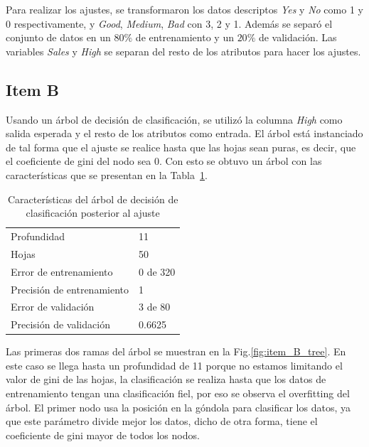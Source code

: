 Para realizar los ajustes, se transformaron los datos descriptos \emph{Yes} y \emph{No} como 1 y 0 respectivamente, y \emph{Good}, \emph{Medium}, \emph{Bad} con 3, 2 y 1. Además se separó el conjunto de datos en un $80\%$ de entrenamiento y un $20\%$ de validación. Las variables \emph{Sales} y \emph{High} se separan del resto de los atributos para hacer los ajustes.

\subsection*{Item B}

Usando un árbol de decisión de clasificación, se utilizó la columna \emph{High} como salida esperada y el resto de los atributos como entrada. El árbol está instanciado de tal forma que  el ajuste se realice hasta que las hojas sean puras, es decir, que el coeficiente de gini del nodo sea 0. Con esto se obtuvo un árbol con las  características que se presentan en la Tabla~\ref{tab:item_B}. 

\begin{table}[H]
    \begin{small}
        \begin{center}
            \begin{tabular}[c]{l|l}
                Profundidad & 11 \\
                Hojas & 50 \\
                Error de entrenamiento & 0 de 320\\
                Precisión de entrenamiento & 1 \\
                Error de validación & 3 de 80\\
                Precisión de validación & 0.6625 \\
            \end{tabular}
        \end{center}
    \end{small}
    \caption{Características del árbol de decisión de clasificación posterior al ajuste}
    \label{tab:item_B}
\end{table}

Las primeras dos ramas del árbol se muestran en la Fig.\ref{fig:item_B_tree}. En este caso se llega hasta un profundidad de 11 porque no estamos limitando el valor de gini de las hojas, la clasificación  se realiza hasta que los datos de entrenamiento tengan una clasificación fiel, por eso se observa el overfitting del árbol. El primer nodo usa la posición en la góndola   para clasificar los datos, ya que este parámetro divide mejor los datos, dicho de otra forma, tiene el coeficiente de gini mayor de todos los nodos.

